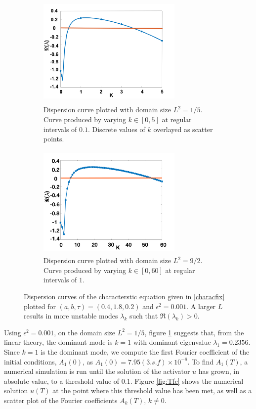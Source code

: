 \begin{figure}[H]
    \centering
    \begin{subfigure}[t]{0.45\textwidth}
        \centering
        \includegraphics[width=7cm,height=5.5cm]{compdisp1.png}
        \caption{Dispersion curve plotted with domain size $L^2=1/5$. Curve produced by varying $k\in[0,5]$ at regular intervals of $0.1$. Discrete values of $k$ overlayed as scatter points. }
        \label{fig:compdisp1}
    \end{subfigure}
    \hfill
    \begin{subfigure}[t]{0.45\textwidth}
        \centering
        \includegraphics[width=7cm,height=5.5cm]{compdisp2.png}
        \caption{Dispersion curve plotted with domain size $L^2=9/2$. Curve produced by varying $k\in[0,60]$ at regular intervals of $1$.}
        \label{fig:compdisp2}
    \end{subfigure}
    \caption{Dispersion curves of the characterstic equation given in \eqref{characfix} plotted for $(a,b,\tau)=(0.4,1.8,0.2)$ and $\epsilon^2=0.001$. A larger $L$ results in more unstable modes $\lambda_k$ such that $\Re(\lambda_k)>0$. }
    \label{fig:compardisp}
\end{figure}
Using $\epsilon^2=0.001$, on the domain size $L^2=1/5$, figure \ref{fig:compdisp1} suggests that, from the linear theory, the dominant mode is $k=1$ with dominant eigenvalue $\lambda_1=0.2356$. Since $k=1$ is the dominant mode, we compute the first Fourier coefficient of the initial conditions, $A_1(0)$, as $A_1(0)=7.95(3.s.f)\times10^{-8}$. To find $A_1(T)$, a numerical simulation is run until the solution of the activator $u$ has grown, in absolute value, to a threshold value of $0.1$. Figure \ref{fig:Tfc} shows the numerical solution $u(T)$ at the point where this threshold value has been met, as well as a scatter plot of the Fourier coefficients $A_k(T)$, $k\neq0$.
